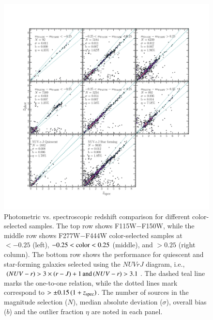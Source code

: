 \documentclass[longauth]{aa}
\begin{document}
\begin{figure}[t!]
\includegraphics[width=1\textwidth, trim=0cm 3cm 0cm 5cm, clip]{figures/specz-vs-photz_vs_color.pdf}
\caption{Photometric vs. spectroscopic redshift comparison for different color-selected samples. The top row shows F115W$ - $F150W, while the middle row shows F277W$-$F444W color-selected samples at $<-0.25$ (left), $-0.25 < {\rm color} <0.25$ (middle), and $>0.25$ (right column). The bottom row shows the performance for quiescent and star-forming galaxies selected using the $NUVrJ$ diagram, i.e., $(NUV - r) > 3\times(r - J) + 1 \, {\rm and} \, (NUV - r) > 3.1$. The dashed teal line marks the one-to-one relation, while the dotted lines mark correspond to \zphot $> \pm 0.15\,(1+z_{\rm spec})$. The number of sources in the magnitude selection ($N$), median absolute deviation ($\sigma$), overall bias ($b$) and the outlier fraction $\eta$ are noted in each panel.
}
\label{fig:photoz-specz-vs-color}
\end{figure}
\end{document}
